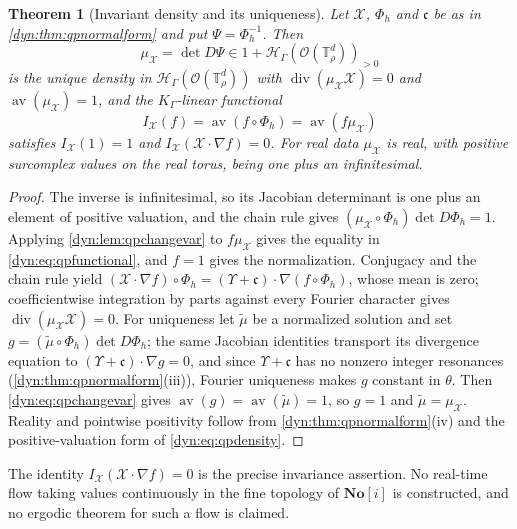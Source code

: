 \documentclass[11pt,letterpaper]{article}
\newtheorem{theorem}{Theorem}[section]
\theoremstyle{definition}
\theoremstyle{remark}
\newcommand{\No}{\mathbf{No}}
\newcommand{\HH}{\mathscr H}
\newcommand{\OO}{\mathcal O}
\newcommand{\TT}{\mathbb T}
\newcommand{\strip}{\OO(\TT^{d}_{\rho})}
\newcommand{\av}{\operatorname{av}}
\newcommand{\diver}{\operatorname{div}}
\numberwithin{equation}{section}
\begin{document}
\begin{theorem}[Invariant density and its uniqueness]\label{dyn:thm:qpdensity}
Let $\mathcal X$, $\Phi_h$ and $\mathfrak c$ be as in
\cref{dyn:thm:qpnormalform} and put $\Psi=\Phi_h^{-1}$. Then
\begin{equation}\label{dyn:eq:qpdensity}
 \mu_{\mathcal X}=\det D\Psi\in1+\HH_\Gamma(\strip)_{>0}
\end{equation}
is the unique density in $\HH_\Gamma(\strip)$ with
$\diver(\mu_{\mathcal X}\mathcal X)=0$ and $\av(\mu_{\mathcal X})=1$, and
the $K_\Gamma$-linear functional
\begin{equation}\label{dyn:eq:qpfunctional}
 I_{\mathcal X}(f)=\av(f\circ\Phi_h)=\av(f\mu_{\mathcal X})
\end{equation}
satisfies $I_{\mathcal X}(1)=1$ and
$I_{\mathcal X}(\mathcal X\cdot\nabla f)=0$. For real data
$\mu_{\mathcal X}$ is real, with positive surcomplex values on the real
torus, being one plus an infinitesimal.
\end{theorem}
\begin{proof}
The inverse is infinitesimal, so its Jacobian determinant is one plus an
element of positive valuation, and the chain rule gives
$(\mu_{\mathcal X}\circ\Phi_h)\det D\Phi_h=1$. Applying
\cref{dyn:lem:qpchangevar} to $f\mu_{\mathcal X}$ gives the equality in
\eqref{dyn:eq:qpfunctional}, and $f=1$ gives the normalization.
Conjugacy and the chain rule yield
$(\mathcal X\cdot\nabla f)\circ\Phi_h=(\Upsilon+\mathfrak c)\cdot
\nabla(f\circ\Phi_h)$, whose mean is zero; coefficientwise integration by
parts against every Fourier character gives
$\diver(\mu_{\mathcal X}\mathcal X)=0$. For uniqueness let
$\widetilde\mu$ be a normalized solution and set
$g=(\widetilde\mu\circ\Phi_h)\det D\Phi_h$; the same Jacobian identities
transport its divergence equation to
$(\Upsilon+\mathfrak c)\cdot\nabla g=0$, and since $\Upsilon+\mathfrak c$
has no nonzero integer resonances (\cref{dyn:thm:qpnormalform}(iii)),
Fourier uniqueness makes $g$ constant in $\theta$. Then
\eqref{dyn:eq:qpchangevar} gives $\av(g)=\av(\widetilde\mu)=1$, so $g=1$
and $\widetilde\mu=\mu_{\mathcal X}$. Reality and pointwise positivity
follow from \cref{dyn:thm:qpnormalform}(iv) and the positive-valuation form
of \eqref{dyn:eq:qpdensity}.
\end{proof}

The identity $I_{\mathcal X}(\mathcal X\cdot\nabla f)=0$ is the precise
invariance assertion. No real-time flow taking values continuously in the
fine topology of $\No[i]$ is constructed, and no ergodic theorem for such a
flow is claimed.
\end{document}
